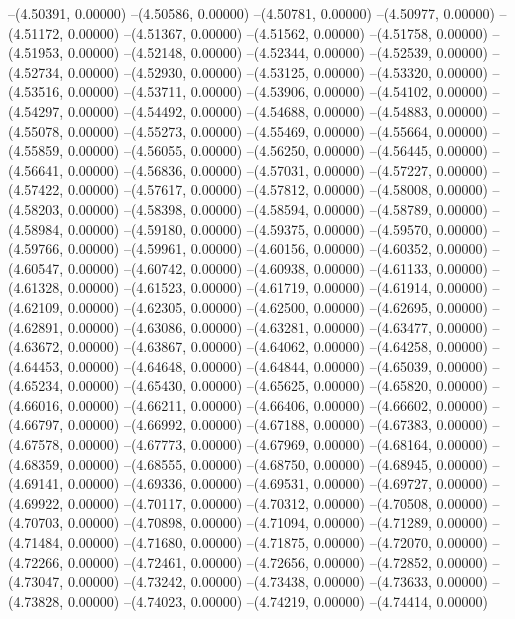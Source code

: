 --(4.50391, 0.00000)
--(4.50586, 0.00000)
--(4.50781, 0.00000)
--(4.50977, 0.00000)
--(4.51172, 0.00000)
--(4.51367, 0.00000)
--(4.51562, 0.00000)
--(4.51758, 0.00000)
--(4.51953, 0.00000)
--(4.52148, 0.00000)
--(4.52344, 0.00000)
--(4.52539, 0.00000)
--(4.52734, 0.00000)
--(4.52930, 0.00000)
--(4.53125, 0.00000)
--(4.53320, 0.00000)
--(4.53516, 0.00000)
--(4.53711, 0.00000)
--(4.53906, 0.00000)
--(4.54102, 0.00000)
--(4.54297, 0.00000)
--(4.54492, 0.00000)
--(4.54688, 0.00000)
--(4.54883, 0.00000)
--(4.55078, 0.00000)
--(4.55273, 0.00000)
--(4.55469, 0.00000)
--(4.55664, 0.00000)
--(4.55859, 0.00000)
--(4.56055, 0.00000)
--(4.56250, 0.00000)
--(4.56445, 0.00000)
--(4.56641, 0.00000)
--(4.56836, 0.00000)
--(4.57031, 0.00000)
--(4.57227, 0.00000)
--(4.57422, 0.00000)
--(4.57617, 0.00000)
--(4.57812, 0.00000)
--(4.58008, 0.00000)
--(4.58203, 0.00000)
--(4.58398, 0.00000)
--(4.58594, 0.00000)
--(4.58789, 0.00000)
--(4.58984, 0.00000)
--(4.59180, 0.00000)
--(4.59375, 0.00000)
--(4.59570, 0.00000)
--(4.59766, 0.00000)
--(4.59961, 0.00000)
--(4.60156, 0.00000)
--(4.60352, 0.00000)
--(4.60547, 0.00000)
--(4.60742, 0.00000)
--(4.60938, 0.00000)
--(4.61133, 0.00000)
--(4.61328, 0.00000)
--(4.61523, 0.00000)
--(4.61719, 0.00000)
--(4.61914, 0.00000)
--(4.62109, 0.00000)
--(4.62305, 0.00000)
--(4.62500, 0.00000)
--(4.62695, 0.00000)
--(4.62891, 0.00000)
--(4.63086, 0.00000)
--(4.63281, 0.00000)
--(4.63477, 0.00000)
--(4.63672, 0.00000)
--(4.63867, 0.00000)
--(4.64062, 0.00000)
--(4.64258, 0.00000)
--(4.64453, 0.00000)
--(4.64648, 0.00000)
--(4.64844, 0.00000)
--(4.65039, 0.00000)
--(4.65234, 0.00000)
--(4.65430, 0.00000)
--(4.65625, 0.00000)
--(4.65820, 0.00000)
--(4.66016, 0.00000)
--(4.66211, 0.00000)
--(4.66406, 0.00000)
--(4.66602, 0.00000)
--(4.66797, 0.00000)
--(4.66992, 0.00000)
--(4.67188, 0.00000)
--(4.67383, 0.00000)
--(4.67578, 0.00000)
--(4.67773, 0.00000)
--(4.67969, 0.00000)
--(4.68164, 0.00000)
--(4.68359, 0.00000)
--(4.68555, 0.00000)
--(4.68750, 0.00000)
--(4.68945, 0.00000)
--(4.69141, 0.00000)
--(4.69336, 0.00000)
--(4.69531, 0.00000)
--(4.69727, 0.00000)
--(4.69922, 0.00000)
--(4.70117, 0.00000)
--(4.70312, 0.00000)
--(4.70508, 0.00000)
--(4.70703, 0.00000)
--(4.70898, 0.00000)
--(4.71094, 0.00000)
--(4.71289, 0.00000)
--(4.71484, 0.00000)
--(4.71680, 0.00000)
--(4.71875, 0.00000)
--(4.72070, 0.00000)
--(4.72266, 0.00000)
--(4.72461, 0.00000)
--(4.72656, 0.00000)
--(4.72852, 0.00000)
--(4.73047, 0.00000)
--(4.73242, 0.00000)
--(4.73438, 0.00000)
--(4.73633, 0.00000)
--(4.73828, 0.00000)
--(4.74023, 0.00000)
--(4.74219, 0.00000)
--(4.74414, 0.00000)

